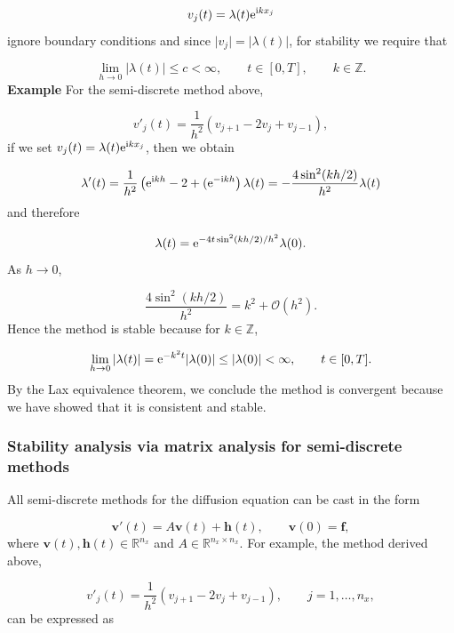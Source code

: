 \documentclass[12pt,a4paper]{article}
\begin{document}
\[
v_j(t) = \lambda(t){\rm e}^{{\rm i}kx_j}
\]
ignore boundary conditions and since $\vert v_j \vert = \vert\lambda(t) \vert$, for stability we require that

\[
\lim_{h \to 0}\left\vert \lambda(t)\right \vert \leq c < \infty, \qquad t \in [0, T], \qquad k \in \mathbb{Z}.
\]
\textbf{Example} For the semi-discrete method above,

\[
v'_j(t) = \frac{1}{h^2}\left(v_{j+1} - 2v_j + v_{j-1}   \right),
\]
if we set $v_j(t) = \lambda(t){\rm e}^{{\rm i}kx_j}$, then we obtain

\[
\lambda'(t) = \frac{1}{h^2}\left({\rm e}^{{\rm i}kh} - 2 +   ({\rm e}^{-{\rm i}kh} \right)\lambda(t) = -\frac{4\sin^2(kh/2)}{h^2}\lambda(t)
\]
and therefore

\[
\lambda(t) = {\rm e}^{-4t\sin^2(kh/2)/h^2}\lambda(0). 
\]
As $h \to 0$, 

\[
\frac{4\sin^2(kh/2)}{h^2} = k^2 + \mathcal{O}(h^2).
\]
Hence the method is stable because for $k \in \mathbb{Z}$,

\[
\lim_{h \to 0} \vert \lambda(t) \vert = {\rm e}^{-k^2t}\vert \lambda(0) \vert \leq  \vert \lambda(0) \vert < \infty, \qquad   t \in [0, T].
\]
By the Lax equivalence theorem, we conclude the method is convergent because we have showed that it is consistent and stable.

\subsubsection{Stability analysis via matrix analysis for semi-discrete methods}
All semi-discrete methods for the diffusion equation can be cast in the form

\[
\mathbf{v}'(t) = A\mathbf{v}(t) + \mathbf{h}(t), \qquad \mathbf{v}(0) = \mathbf{f}, 
\]
where $\mathbf{v}(t), \mathbf{h}(t) \in \mathbb{R}^{n_x}$ and  $A \in \mathbb{R}^{n_x \times n_x}$.  For example, the method derived above,

\[
v'_j(t) = \frac{1}{h^2}\left(v_{j+1} - 2v_j + v_{j-1}   \right), \qquad j  = 1, \ldots, n_x,
\]
can be expressed as
\end{document}
